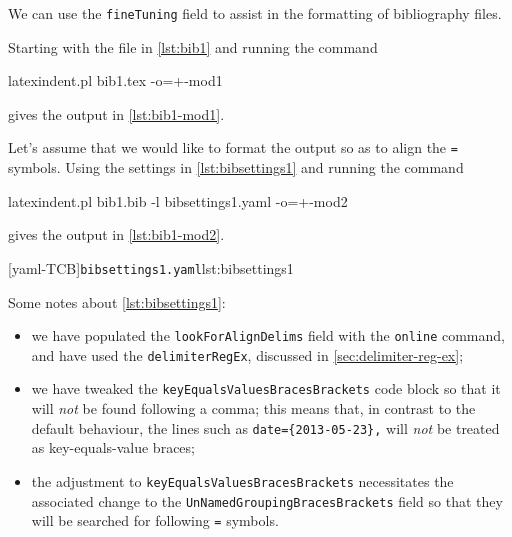  \begin{example}
  We can use the \texttt{fineTuning} field to assist in the formatting of bibliography
  files.  
    

  Starting with the file in \cref{lst:bib1} and running the command
  \begin{commandshell}
latexindent.pl bib1.tex -o=+-mod1 
   \end{commandshell}
  gives the output in \cref{lst:bib1-mod1}.

  \begin{widepage}
   \begin{cmhtcbraster}[raster column skip=.01\linewidth]
   \end{cmhtcbraster}
  \end{widepage}

  Let's assume that we would like to format the output so as to align the \texttt{=}
  symbols. Using the settings in \cref{lst:bibsettings1} and running the command
  \begin{commandshell}
latexindent.pl bib1.bib -l bibsettings1.yaml -o=+-mod2 
     \end{commandshell}
  gives the output in \cref{lst:bib1-mod2}.

  \begin{widepage}
   \begin{cmhtcbraster}[raster column skip=.1\linewidth]
    [yaml-TCB]{\texttt{bibsettings1.yaml}}{lst:bibsettings1}
   \end{cmhtcbraster}
  \end{widepage}
  Some notes about \cref{lst:bibsettings1}:
  \begin{itemize}
   \item we have populated the \texttt{lookForAlignDelims} field with the \texttt{online} command,
         and have used the \texttt{delimiterRegEx}, discussed in \vref{sec:delimiter-reg-ex};
   \item we have tweaked the \texttt{keyEqualsValuesBracesBrackets} code block so that it will
         \emph{not} be found following a comma; this means that, in contrast to the default
         behaviour, the lines such as \lstinline!date={2013-05-23},! will \emph{not} be treated as
         key-equals-value braces;
   \item the adjustment to \texttt{keyEqualsValuesBracesBrackets} necessitates the associated
         change to the \texttt{UnNamedGroupingBracesBrackets} field so that they will be searched
         for following \texttt{=} symbols.
  \end{itemize}
 \end{example}

